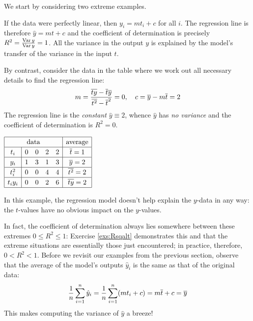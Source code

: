 \begin{examples}{}{}
	We start by considering two extreme examples.\vspace{-1pt}
	\begin{enumerate}
	  \item If the data were perfectly linear, then $y_i=mt_i+c$ for all $i$. The regression line is therefore $\hat y=mt+c$ and the coefficient of determination is precisely $R^2=\frac{\operatorname{Var} y}{\operatorname{Var} y}=1$. All the variance in the output $y$ is explained by the model's transfer of the variance in the input $t$.\par
		\begin{minipage}[t]{0.6\linewidth}\vspace{0pt}
		  \item By contrast, consider the data in the table where we work out all necessary details to find the regression line:
		  \[
		  	m=\frac{\overline{ty}-\overline{t}\overline{y}}{\overline{t^2}-\overline{t}^2}=0,\quad c=\overline{y}-m\overline{t}=2
		  \]
		  The regression line is the \emph{constant} $\hat y\equiv 2$, whence $\hat y$ has \emph{no variance} and the coefficient of determination is $R^2=0$.
		\end{minipage}
		\hfill
		\begin{minipage}[t]{0.39\linewidth}\vspace{0pt}
			\flushright
			$\renewcommand{\arraystretch}{1.2}
			\begin{array}{|c|cccc|c|}
				\hline
				\multicolumn{5}{|c|}{\text{data}}&\text{average}\\\hline
				t_i&0&0&2&2&\cl t=1\\\hline
				y_i&1&3&1&3&\cl y=2\\\hline
				t_i^2&0&0&4&4&\cl{t^2}=2\\\hline
				t_iy_i&0&0&2&6&\cl{ty}=2\\\hline%
			\end{array}$
		\end{minipage}\par
		In this example, the regression model doesn't help explain the $y$-data in any way: the $t$-values have no obvious impact on the $y$-values.
	\end{enumerate}
\end{examples}

\goodbreak

In fact, the coefficient of determination always lies somewhere between these extremes $0\le R^2\le 1$: Exercise \ref{exs:Rsqalt} demonstrates this and that the extreme situations are essentially those just encountered; in practice, therefore, $0<R^2<1$. Before we revisit our examples from the previous section, observe that the average of the model's outputs $\hat y_i$ is the same as that of the original data:
\[
	\frac 1n\sum_{i=1}^n\hat y_i=\frac 1n\sum_{i=1}^n(mt_i+c)=m\overline{t}+c=\overline{y}
\]
This makes computing the variance of $\hat y$ a breeze!

